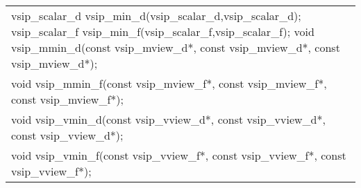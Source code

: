 \\\cvsiplh
\afh
{
\ttfamily
\\\hspace*{.04\textwidth}\begin{tabular}[H]{l}
vsip\_scalar\_d vsip\_min\_d(vsip\_scalar\_d,vsip\_scalar\_d);
vsip\_scalar\_f vsip\_min\_f(vsip\_scalar\_f,vsip\_scalar\_f);
void vsip\_mmin\_d(const vsip\_mview\_d*, const vsip\_mview\_d*, const vsip\_mview\_d*);\\
void vsip\_mmin\_f(const vsip\_mview\_f*, const vsip\_mview\_f*, const vsip\_mview\_f*);\\
void vsip\_vmin\_d(const vsip\_vview\_d*, const vsip\_vview\_d*, const vsip\_vview\_d*);\\
void vsip\_vmin\_f(const vsip\_vview\_f*, const vsip\_vview\_f*, const vsip\_vview\_f*);\\
\end{tabular}
}
\\\pyjvsiph
%
%
%
